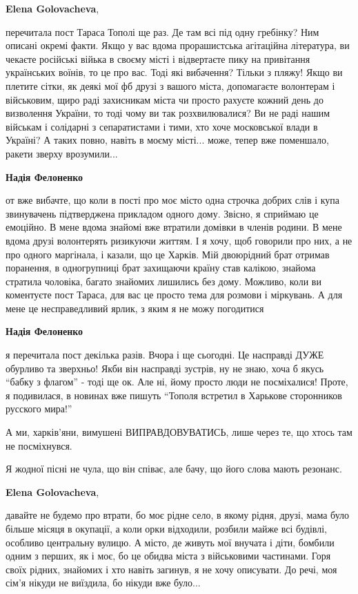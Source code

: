 \begin{itemize}
\begin{itemize}
\textbf{Elena Golovacheva}, 

перечитала пост Тараса Тополі ще раз. Де там всі під одну гребінку? Ним описані
окремі факти. Якщо у вас вдома прорашистська агітаційна література, ви чекаєте
російські війька в своєму місті і відвертаєте пику на привітання українських
воїнів, то це про вас. Тоді які вибачення? Тільки з пляжу! Якщо ви плетите
сітки, як деякі мої фб друзі з вашого міста, допомагаєте волонтерам і
військовим, щиро раді захисникам міста чи просто рахуєте кожний день до
визволення України, то тоді чому ви так розхвилювалися? Ви не раді нашим
військам і солідарні з сепаратистами і тими, хто хоче московської влади в
Україні? А таких повно, навіть в моєму місті... може, тепер вже поменшало,
ракети зверху врозумили...

\textbf{Надія Фелоненко} 

от вже вибачте, що коли в пості про моє місто одна строчка добрих слів і купа
звинувачень підтверджена прикладом одного дому. Звісно, я сприймаю це емоційно.
В мене вдома знайомі вже втратили домівки в членів родини. В мене вдома друзі
волонтерять ризикуючи життям. І я хочу, щоб говорили про них, а не про одного
маргінала, і казали, що це Харків. Мій двоюрідний брат отримав поранення, в
одногрупниці брат захищаючи країну став калікою, знайома стратила чоловіка,
багато знайомих лишились без дому. Можливо, коли ви коментуєте пост Тараса, для
вас це просто тема для розмови і міркувань. А для мене це несправедливий ярлик,
з яким я не можу погодитися

\textbf{Надія Фелоненко} 

я перечитала пост декілька разів. Вчора і ще сьогодні. Це насправді ДУЖЕ
обурливо та зверхньо! Якби він насправді зустрів, ну не знаю, хоча б якусь
\enquote{бабку з флагом} - тоді ще ок. Але ні, йому просто люди не посміхалися! Проте,
я подивилася, в новинах вже пишуть \enquote{Тополя встретил в Харькове сторонников
русского мира!}

А ми, харків'яни, вимушені ВИПРАВДОВУВАТИСЬ, лише через те, що хтось там не
посміхнувся.

Я жодної пісні не чула, що він співає, але бачу, що його слова мають резонанс.

\textbf{Elena Golovacheva}, 

давайте не будемо про втрати, бо моє рідне село, в якому рідня, друзі, мама
було більше місяця в окупації, а коли орки відходили, розбили майже всі
будівлі, особливо центральну вулицю. А місто, де живуть мої внучата і діти,
бомбили одним з перших, як і моє, бо це обидва міста з військовими частинами.
Горя своїх рідних, знайомих і хто навіть загинув, я не хочу описувати. До речі,
моя сім'я нікуди не виїздила, бо нікуди вже було...


\end{itemize}
\end{itemize}
